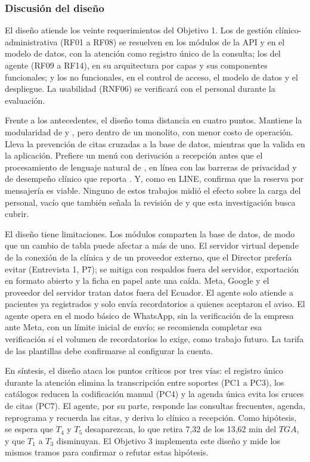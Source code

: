 \subsubsection{Discusión del diseño}

El diseño atiende los veinte requerimientos del Objetivo 1. Los de gestión clínico-administrativa (RF01 a RF08) se resuelven en los módulos de la API y en el modelo de datos, con la atención como registro único de la consulta; los del agente (RF09 a RF14), en su arquitectura por capas y sus componentes funcionales; y los no funcionales, en el control de acceso, el modelo de datos y el despliegue. La usabilidad (RNF06) se verificará con el personal durante la evaluación.

Frente a los antecedentes, el diseño toma distancia en cuatro puntos. Mantiene la modularidad de \cite{roca2020microservice} y \cite{arcila2022microservice}, pero dentro de un monolito, con menor costo de operación. Lleva la prevención de citas cruzadas a la base de datos, mientras que \cite{shaikh2026smartmedibook} la valida en la aplicación. Prefiere un menú con derivación a recepción antes que el procesamiento de lenguaje natural de \cite{alejandrino2023dental}, en línea con las barreras de privacidad y de desempeño clínico que reporta \cite{hindelang2024chatbots}. Y, como \cite{hmadchayyapum2025line} en LINE, confirma que la reserva por mensajería es viable. Ninguno de estos trabajos midió el efecto sobre la carga del personal, vacío que también señala la revisión de \cite{tudorcar2020conversational} y que esta investigación busca cubrir.

El diseño tiene limitaciones. Los módulos comparten la base de datos, de modo que un cambio de tabla puede afectar a más de uno. El servidor virtual depende de la conexión de la clínica y de un proveedor externo, que el Director prefería evitar (Entrevista 1, P7); se mitiga con respaldos fuera del servidor, exportación en formato abierto y la ficha en papel ante una caída. Meta, Google y el proveedor del servidor tratan datos fuera del Ecuador. El agente solo atiende a pacientes ya registrados y solo envía recordatorios a quienes aceptaron el aviso. El agente opera en el modo básico de WhatsApp, sin la verificación de la empresa ante Meta, con un límite inicial de envío; se recomienda completar esa verificación si el volumen de recordatorios lo exige, como trabajo futuro. La tarifa de las plantillas debe confirmarse al configurar la cuenta.

En síntesis, el diseño ataca los puntos críticos por tres vías: el registro único durante la atención elimina la transcripción entre soportes (PC1 a PC3), los catálogos reducen la codificación manual (PC4) y la agenda única evita los cruces de citas (PC7). El agente, por su parte, responde las consultas frecuentes, agenda, reprograma y recuerda las citas, y deriva lo clínico a recepción. Como hipótesis, se espera que $T_4$ y $T_5$ desaparezcan, lo que retira 7,32 de los 13,62 min del $TGA$, y que $T_1$ a $T_3$ disminuyan. El Objetivo 3 implementa este diseño y mide los mismos tramos para confirmar o refutar estas hipótesis.
